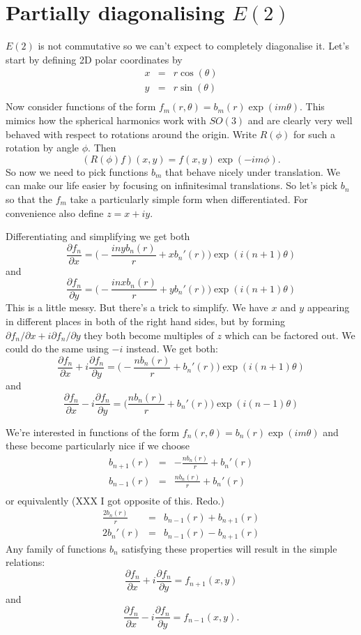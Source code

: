 \documentclass{article}
\begin{document}
\section{Partially diagonalising $E(2)$}
$E(2)$ is not commutative so we can't expect to completely diagonalise it.
Let's start by defining 2D polar coordinates by
\begin{align*}
x & = & r\cos(\theta) \\
y & = & r\sin(\theta) \\
\end{align*}
Now consider functions of the form $f_m(r,\theta)=b_m(r)\exp(im\theta)$.
This mimics how the spherical harmonics work with $SO(3)$ and are clearly very well behaved with respect to rotations around the origin.
Write $R(\phi)$ for such a rotation by angle $\phi$.
Then 
\[
(R(\phi)f)(x,y) = f(x,y)\exp(-im\phi).
\]
So now we need to pick functions $b_m$ that behave nicely under translation.
We can make our life easier by focusing on infinitesimal translations.
So let's pick $b_n$ so that the $f_m$ take a particularly simple form when differentiated.
For convenience also define $z=x+iy$.

Differentiating and simplifying we get both
\[
\frac{\partial f_n}{\partial x} = 
    \Big(-\frac{inyb_n(r)}{r}+xb_n'(r)\Big)\exp(i(n+1)\theta)
\]
and
\[
\frac{\partial f_n}{\partial y} = 
    \Big(-\frac{inxb_n(r)}{r}+yb_n'(r)\Big)\exp(i(n+1)\theta)
\]
This is a little messy.
But there's a trick to simplify.
We have $x$ and $y$ appearing in different places in both of the right hand sides, but by forming $\partial f_n/\partial x+i\partial f_n/\partial y$ they both become multiples of $z$ which can be factored out.
We could do the same using $-i$ instead.
We get both:
\[
\frac{\partial f_n}{\partial x}+i\frac{\partial f_n}{\partial y} =
    \Big(-\frac{nb_n(r)}{r}+b_n'(r)\Big)\exp(i(n+1)\theta)
\]
and
\[
\frac{\partial f_n}{\partial x}-i\frac{\partial f_n}{\partial y} =
    \Big(\frac{nb_n(r)}{r}+b_n'(r)\Big)\exp(i(n-1)\theta)
\]

We're interested in functions of the form
$f_n(r,\theta)=b_n(r)\exp(im\theta)$
and these become particularly nice if we choose
\begin{align*}
b_{n+1}(r) & = & -\frac{nb_n(r)}{r}+b_n'(r) \\
b_{n-1}(r) & = & \frac{nb_n(r)}{r}+b_n'(r) \\
\end{align*}
or equivalently
(XXX I got opposite of this. Redo.)
\begin{align}
\frac{2b_n(r)}{r} & = & b_{n-1}(r)+b_{n+1}(r) \label{sum} \\
2b_n'(r) & = & b_{n-1}(r)-b_{n+1}(r) \label{deriv}
\end{align}
Any family of functions $b_n$ satisfying these properties will result in the simple relations:
\[
\frac{\partial f_n}{\partial x}+i\frac{\partial f_n}{\partial y} =
    f_{n+1}(x,y)
\]
and
\[
\frac{\partial f_n}{\partial x}-i\frac{\partial f_n}{\partial y} =
    f_{n-1}(x,y).
\]
\end{document}

